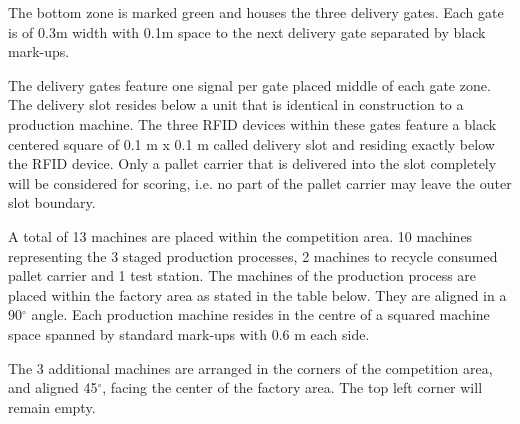 \documentclass[12pt,twoside]{article}
\begin{document}
The bottom zone is marked green and houses the three delivery gates.
Each gate is of 0.3m width with 0.1m space to the next delivery gate
separated by black mark-ups.

The delivery gates feature one signal per gate placed middle of each
gate zone. The delivery slot resides below a unit that is identical in
construction to a production machine. The three RFID devices within
these gates feature a black centered square of 0.1 m x 0.1 m called
delivery slot and residing exactly below the RFID device. Only a
pallet carrier that is delivered into the slot completely will be
considered for scoring, i.e. no part of the pallet carrier may leave
the outer slot boundary.

A total of 13 machines are placed within the competition area. 10
machines representing the 3 staged production processes, 2 machines to
recycle consumed pallet carrier and 1 test station. The machines of
the production process are placed within the factory area as stated in
the table below. They are aligned in a 90$^\circ$ angle. Each production
machine resides in the centre of a squared machine space spanned by
standard mark-ups with 0.6 m each side.

The 3 additional machines are arranged in the corners of the
competition area, and aligned 45$^\circ$, facing the center of the factory
area. The top left corner will remain empty.
\end{document}
